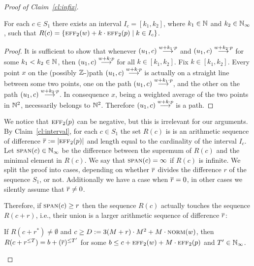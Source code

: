 \begin{proof}[Proof of Claim~\ref{cl:infix}]

\begin{claim}\label{cl:interval}
For each $c \in S_1$ there exists an interval $I_{c} = [k_1, k_2]$, where $k_1\in \mathbb{N}$ and $k_2 \in \mathbb{N}_{\infty}$,
such that
$R(c) = \{\textsc{eff}_2(w) + k \cdot \textsc{eff}_2(p) \mid k\in I_{c}\}$.
\end{claim}

\begin{proof}
It is sufficient to show that whenever $(u_1, c) \stackrel{w + k_1 \cdot p}{\longrightarrow}$ and
$(u_1, c) \stackrel{w + k_2 \cdot p}{\longrightarrow}$ for some
$k_1 < k_2 \in \mathbb{N}$,
then
$(u_1, c) \stackrel{w + k \cdot p}{\longrightarrow}$ for all $k \in [k_1, k_2]$.
Fix $k \in [k_1, k_2]$.
Every point $x$ on the (possibly $\mathbb{Z}$-)path $(u_1, c) \stackrel{w + k \cdot p}{\longrightarrow}$ is actually on a straight line between some two points,
one on the path $(u_1, c) \stackrel{w + k_1 \cdot p}{\longrightarrow}$, and the other on the path $(u_1, c) \stackrel{w + k_2 \cdot p}{\longrightarrow}$.
In consequence $x$, being a weighted average of the two points in $\mathbb{N}^2$, necessarily belongs to $\mathbb{N}^2$. 
Therefore $(u_1, c) \stackrel{w + k \cdot p}{\longrightarrow}$ is a path.
\end{proof}

We notice that $\textsc{eff}_2(p)$ can be negative, but this is irrelevant for our arguments.
%
By Claim~\ref{cl:interval}, for each $c \in S_1$ the set $R(c)$ is
is an arithmetic sequence of difference $\overline{r} := |\textsc{eff}_2(p)|$ and length equal to the cardinality
of the interval $I_{c}$.
Let $\textsc{span}(c)\in\mathbb{N}_\infty$ be the difference between the supremum of $R(c)$ and the minimal element in $R(c)$.
We say that $\textsc{span}(c) = \infty$ if $R(c)$ is infinite.
We split the proof into cases, depending on
whether $\overline{r}$ divides the difference $r$ of the sequence $S_1$, or not.
Additionally we have a case when $\overline{r} = 0$, in other cases we silently assume that $\overline{r} \neq 0$.



Therefore, if $\textsc{span}(c) \geq r$ then the sequence $R(c)$ actually touches the sequence $R(c+r)$,
i.e., their union is a larger arithmetic sequence of difference $\overline{r}$:

\begin{claim}\label{cl:merged}
If $R(c+r^*) \neq \emptyset$ and $c \geq D:= 3(M+r) \cdot M^2 + M \cdot \textsc{norm}(w)$,
then $R(c+r^{\leq T}) = b+(\overline{r})^{\leq T'}$ for some $b \leq c + \textsc{eff}_2(w) + M \cdot \textsc{eff}_2(p)$ and $T' \in \mathbb{N}_\infty$.
\end{claim}


\end{proof}
